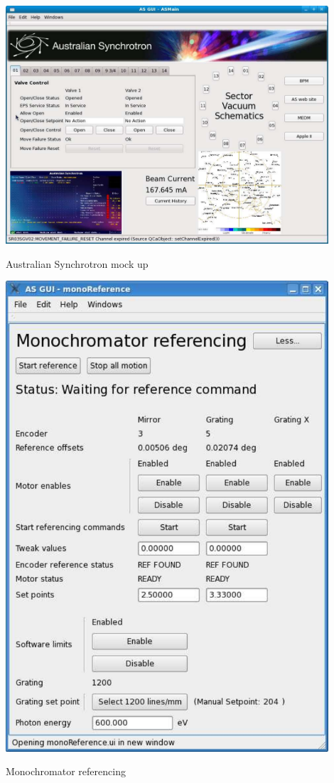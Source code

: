  
\begin{DoxyImage}
\includegraphics[width=12cm]{ASguiExample1}
\caption{Australian Synchrotron mock up}
\end{DoxyImage}
 \par
\par


 \par
\par
 
\begin{DoxyImage}
\includegraphics[width=12cm]{ASguiExample2}
\caption{Monochromator referencing}
\end{DoxyImage}
 \par
\par


